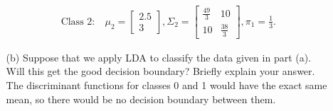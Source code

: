 \documentclass[10pt]{article}
\begin{document}
\begin{enumerate}[1.]
\begin{itemize}
{\begin{align*}
                        \text{Class 2}: & \ \mu_2 =
                        \begin{bmatrix}
                            2.5 \\
                            3
                        \end{bmatrix}, \Sigma_2 = \begin{bmatrix}
                            \frac{49}{3} & 10           \\
                            10           & \frac{38}{3}
                        \end{bmatrix},\pi_1 = \frac{1}{3}.
                    \end{align*} }
              \item[(b)] Suppose that we apply LDA to classify the data given in part (a). Will this get the good decision boundary? Briefly explain your answer.~ \\
                    {\color{blue}The discriminant functions for classes 0 and 1 would
                    have the exact same mean, so there would be no decision boundary between them.}
          \end{itemize}






\end{enumerate}
\end{document}
